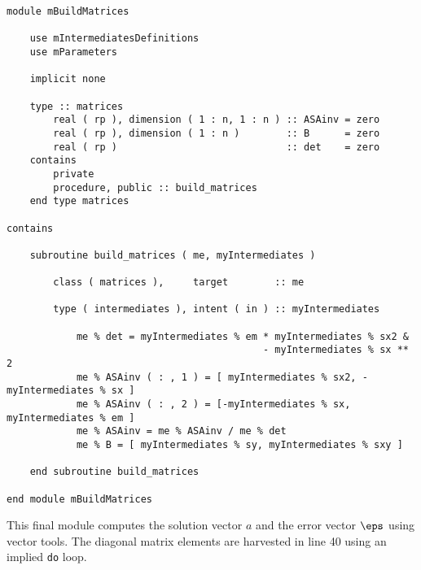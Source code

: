 \begin{lstlisting}
module mBuildMatrices

    use mIntermediatesDefinitions
    use mParameters

    implicit none

    type :: matrices
        real ( rp ), dimension ( 1 : n, 1 : n ) :: ASAinv = zero
        real ( rp ), dimension ( 1 : n )        :: B      = zero
        real ( rp )                             :: det    = zero
    contains
        private
        procedure, public :: build_matrices
    end type matrices

contains

    subroutine build_matrices ( me, myIntermediates )

        class ( matrices ),     target        :: me

        type ( intermediates ), intent ( in ) :: myIntermediates

            me % det = myIntermediates % em * myIntermediates % sx2 &
                                            - myIntermediates % sx ** 2
            me % ASAinv ( : , 1 ) = [ myIntermediates % sx2, -myIntermediates % sx ]
            me % ASAinv ( : , 2 ) = [-myIntermediates % sx,   myIntermediates % em ]
            me % ASAinv = me % ASAinv / me % det
            me % B = [ myIntermediates % sy, myIntermediates % sxy ]

    end subroutine build_matrices

end module mBuildMatrices
\end{lstlisting}
This final module computes the solution vector $a$ and the error vector $\eps$ using vector tools. The diagonal matrix elements are harvested in line 40 using an implied \texttt{do} loop.
